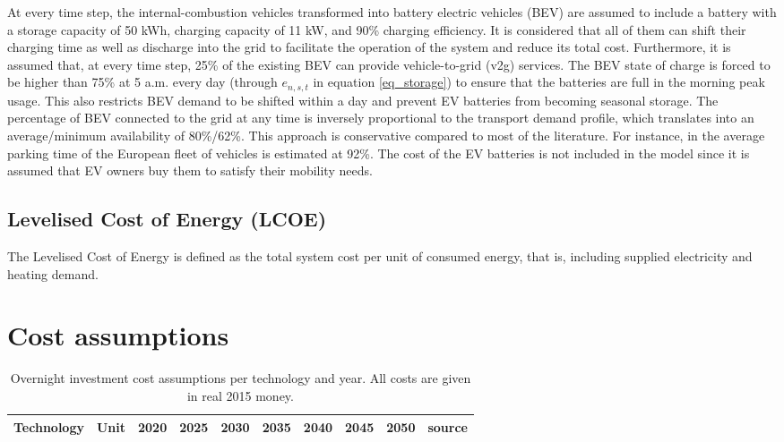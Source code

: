 \documentclass[3p]{elsarticle} %
\begin{document}
At every time step, the internal-combustion vehicles transformed into battery electric vehicles (BEV) are assumed to include a battery with a storage capacity of 50 kWh, charging capacity of 11 kW, and 90\% charging efficiency. It is considered that all of them can shift their charging time as well as discharge into the grid to facilitate the operation of the system and reduce its total cost. Furthermore, it is assumed that, at every time step, 25\% of the existing BEV can provide vehicle-to-grid (v2g) services. The BEV state of charge is forced to be higher than 75\% at 5 a.m. every day (through $e_{n,s,t}$ in equation \ref{eq_storage}) to ensure that the batteries are full in the morning peak usage. This also restricts BEV demand to be shifted within a day and prevent EV batteries from becoming seasonal storage. The percentage of BEV connected to the grid at any time is inversely proportional to the transport demand profile, which translates into an average/minimum availability of 80\%/62\%. This approach is conservative compared to most of the literature. For instance, in \cite{circular_economy} the average parking time of the European fleet of vehicles is estimated at 92\%. The cost of the EV batteries is not included in the model since it is assumed that EV owners buy them to satisfy their mobility needs. 


\subsection{Levelised Cost of Energy (LCOE)}

The Levelised Cost of Energy is defined as the total system cost per unit of consumed energy, that is, including supplied electricity and heating demand. \\

\section{Cost assumptions}	

\begin{table}[!b]
\footnotesize
\centering
\begin{threeparttable}
\caption{Overnight investment cost assumptions per technology and year. All costs are given in real 2015 money. } \label{tab:cost per year}
\centering
\begin{tabularx}{18cm}{lccccccccr}
\toprule
Technology\tnote{1}& Unit & 2020&2025&2030&2035&2040&2045&2050&source\\
\midrule

\bottomrule
\end{tabularx}
\end{threeparttable}
\end{table}
\end{document}
